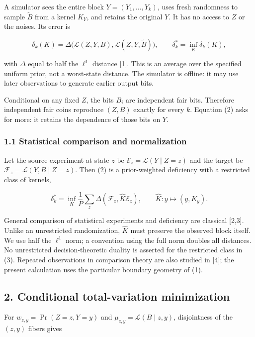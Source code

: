 \documentclass[
]{article}
\begin{document}
A simulator sees the entire block \(Y=(Y_1,\ldots,Y_k)\), uses fresh
randomness to sample \(\widetilde B\) from a kernel \(K_Y\), and retains
the original \(Y\). It has no access to \(Z\) or the noises. Its error
is

\[
\delta_k(K)=\Delta\bigl(\mathcal L(Z,Y,B),\mathcal L(Z,Y,\widetilde B)\bigr),
\qquad \delta_k^*=\inf_K\delta_k(K),
\tag{2}
\]

with \(\Delta\) equal to half the \(\ell^1\) distance {[}1{]}. This is
an average over the specified uniform prior, not a worst-state distance.
The simulator is offline: it may use later observations to generate
earlier output bits.

Conditional on any fixed \(Z\), the bits \(B_i\) are independent fair
bits. Therefore independent fair coins reproduce \((Z,B)\) exactly for
every \(k\). Equation (2) asks for more: it retains the dependence of
those bits on \(Y\).

\subsubsection{1.1 Statistical comparison and
normalization}\label{statistical-comparison-and-normalization}

Let the source experiment at state \(z\) be
\(\mathcal E_z=\mathcal L(Y\mid Z=z)\) and the target be
\(\mathcal F_z=\mathcal L(Y,B\mid Z=z)\). Then (2) is a prior-weighted
deficiency with a restricted class of kernels,

\[
\delta_k^*=\inf_K\frac1P\sum_z\Delta(\mathcal F_z,\widehat K\mathcal E_z),
\qquad \widehat K:y\longmapsto(y,K_y).
\tag{3}
\]

General comparison of statistical experiments and deficiency are
classical {[}2,3{]}. Unlike an unrestricted randomization,
\(\widehat K\) must preserve the observed block itself. We use half the
\(\ell^1\) norm; a convention using the full norm doubles all distances.
No unrestricted decision-theoretic duality is asserted for the
restricted class in (3). Repeated observations in comparison theory are
also studied in {[}4{]}; the present calculation uses the particular
boundary geometry of (1).

\subsection{2. Conditional total-variation
minimization}\label{conditional-total-variation-minimization}

For \(w_{z,y}=\Pr(Z=z,Y=y)\) and \(\mu_{z,y}=\mathcal L(B\mid z,y)\),
disjointness of the \((z,y)\) fibers gives
\end{document}
